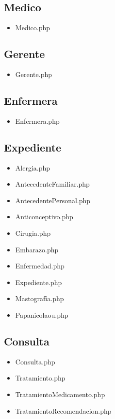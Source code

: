 		\subsection{Medico}
		\begin{itemize}
			\item Medico.php
		\end{itemize}				
		
		\subsection{Gerente}
		\begin{itemize}
			\item Gerente.php
		\end{itemize}				
		
		\subsection{Enfermera}
		\begin{itemize}
			\item Enfermera.php
		\end{itemize}				
		
		\subsection{Expediente}
		\begin{itemize}
			\item Alergia.php
			\item AntecedenteFamiliar.php
			\item AntecedentePersonal.php
			\item Anticonceptivo.php
			\item Cirugia.php
			\item Embarazo.php
			\item Enfermedad.php
			\item Expediente.php
			\item Mastografía.php
			\item Papanicolaou.php
		\end{itemize}				
		
		\subsection{Consulta}
		\begin{itemize}
			\item Consulta.php
			\item Tratamiento.php
			\item TratamientoMedicamento.php
			\item TratamientoRecomendacion.php
		\end{itemize}
